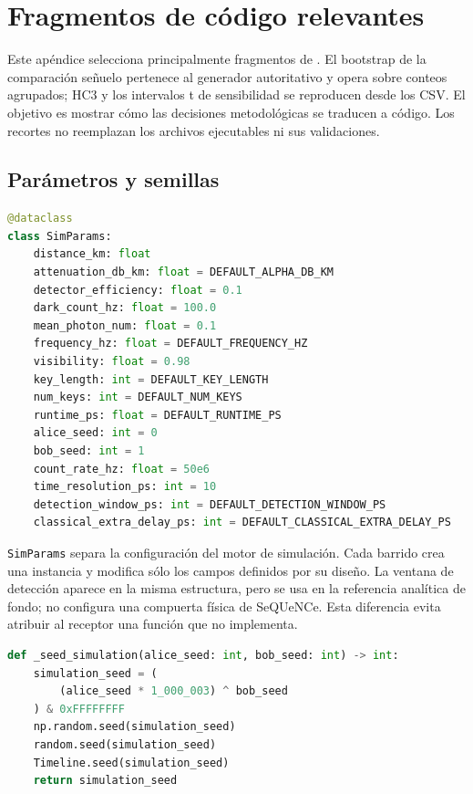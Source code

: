 \chapter{Fragmentos de código relevantes}
\label{app:codigo}

Este apéndice selecciona principalmente fragmentos de . El bootstrap de la comparación señuelo pertenece al generador autoritativo y opera sobre conteos agrupados; HC3 y los intervalos t de sensibilidad se reproducen desde los CSV. El objetivo es mostrar cómo las decisiones metodológicas se traducen a código. Los recortes no reemplazan los archivos ejecutables ni sus validaciones.

\section{Parámetros y semillas}

\begin{lstlisting}[language=Python, caption={Contrato de parámetros de una corrida.}]
@dataclass
class SimParams:
    distance_km: float
    attenuation_db_km: float = DEFAULT_ALPHA_DB_KM
    detector_efficiency: float = 0.1
    dark_count_hz: float = 100.0
    mean_photon_num: float = 0.1
    frequency_hz: float = DEFAULT_FREQUENCY_HZ
    visibility: float = 0.98
    key_length: int = DEFAULT_KEY_LENGTH
    num_keys: int = DEFAULT_NUM_KEYS
    runtime_ps: float = DEFAULT_RUNTIME_PS
    alice_seed: int = 0
    bob_seed: int = 1
    count_rate_hz: float = 50e6
    time_resolution_ps: int = 10
    detection_window_ps: int = DEFAULT_DETECTION_WINDOW_PS
    classical_extra_delay_ps: int = DEFAULT_CLASSICAL_EXTRA_DELAY_PS
\end{lstlisting}

\texttt{SimParams} separa la configuración del motor de simulación. Cada barrido crea una instancia y modifica sólo los campos definidos por su diseño. La ventana de detección aparece en la misma estructura, pero se usa en la referencia analítica de fondo; no configura una compuerta física de SeQUeNCe. Esta diferencia evita atribuir al receptor una función que no implementa.

\begin{lstlisting}[language=Python, caption={Semilla común para las fuentes aleatorias del modelo.}]
def _seed_simulation(alice_seed: int, bob_seed: int) -> int:
    simulation_seed = (
        (alice_seed * 1_000_003) ^ bob_seed
    ) & 0xFFFFFFFF
    np.random.seed(simulation_seed)
    random.seed(simulation_seed)
    Timeline.seed(simulation_seed)
    return simulation_seed
\end{lstlisting}

